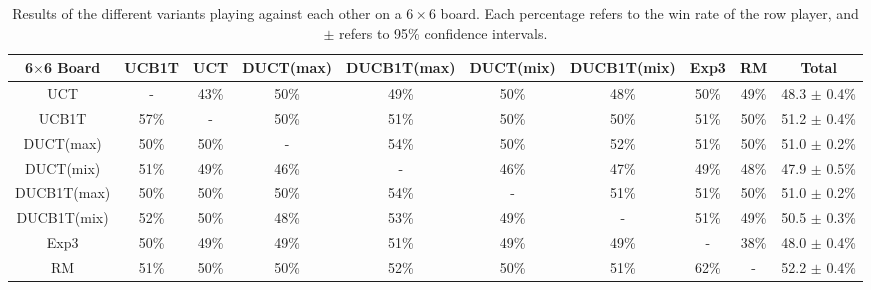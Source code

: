 \documentclass{article}
\begin{document}
\begin{table}[h!]\scriptsize
\centering
\begin{tabular}{|c||c|c|c|c|c|c|c|c||c|}
									\hline
	6$\times$6 Board	& UCB1T 	& UCT		& DUCT(max)	& DUCB1T(max)	& DUCT(mix)	& DUCB1T(mix)	& Exp3 & RM & Total \\ \hline
   UCT &    - & 43\% & 50\% & 49\% & 50\% & 48\% & 50\% & 49\%       & 48.3 $\pm$ 0.4\% \\ \hline 
 UCB1T & 57\% &    - & 50\% & 51\% & 50\% & 50\% & 51\% & 50\%       & 51.2 $\pm$ 0.4\% \\ \hline 
   DUCT(max) & 50\% & 50\% &    - & 54\% & 50\% & 52\% & 51\% & 50\% & 51.0 $\pm$ 0.2\% \\ \hline 
   DUCT(mix) & 51\% & 49\% & 46\% &    - & 46\% & 47\% & 49\% & 48\% & 47.9 $\pm$ 0.5\% \\ \hline 
 DUCB1T(max) & 50\% & 50\% & 50\% & 54\% &    - & 51\% & 51\% & 50\% & 51.0 $\pm$ 0.2\% \\ \hline 
 DUCB1T(mix) & 52\% & 50\% & 48\% & 53\% & 49\% &    - & 51\% & 49\% & 50.5 $\pm$ 0.3\% \\ \hline 
      Exp3 & 50\% & 49\% & 49\% & 51\% & 49\% & 49\% &    - & 38\%   & 48.0 $\pm$ 0.4\% \\ \hline 
        RM & 51\% & 50\% & 50\% & 52\% & 50\% & 51\% & 62\% &    -   & 52.2 $\pm$ 0.4\% \\ \hline 
\end{tabular}
\caption{Results of the different variants playing against each other on a $6\times6$ board. 
Each percentage refers to the win rate of the row player, and $\pm$ refers to 95\% confidence intervals.}
\label{table:rr_small}
\end{table}
\end{document}

